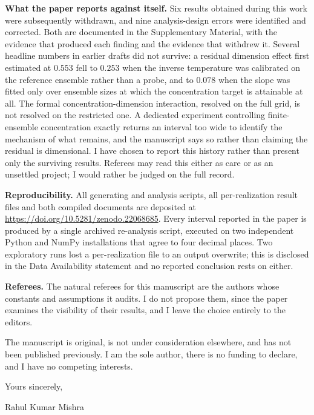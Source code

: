 \documentclass[10.5pt,a4paper]{article}
\begin{document}
\textbf{What the paper reports against itself.} Six results obtained during this work were subsequently withdrawn, and nine analysis-design errors were identified and corrected. Both are documented in the Supplementary Material, with the evidence that produced each finding and the evidence that withdrew it. Several headline numbers in earlier drafts did not survive: a residual dimension effect first estimated at $0.553$ fell to $0.253$ when the inverse temperature was calibrated on the reference ensemble rather than a probe, and to $0.078$ when the slope was fitted only over ensemble sizes at which the concentration target is attainable at all. The formal concentration-dimension interaction, resolved on the full grid, is not resolved on the restricted one. A dedicated experiment controlling finite-ensemble concentration exactly returns an interval too wide to identify the mechanism of what remains, and the manuscript says so rather than claiming the residual is dimensional. I have chosen to report this history rather than present only the surviving results. Referees may read this either as care or as an unsettled project; I would rather be judged on the full record.

\textbf{Reproducibility.} All generating and analysis scripts, all per-realization result files and both compiled documents are deposited at \url{https://doi.org/10.5281/zenodo.22068685}. Every interval reported in the paper is produced by a single archived re-analysis script, executed on two independent Python and NumPy installations that agree to four decimal places. Two exploratory runs lost a per-realization file to an output overwrite; this is disclosed in the Data Availability statement and no reported conclusion rests on either.

\textbf{Referees.} The natural referees for this manuscript are the authors whose constants and assumptions it audits. I do not propose them, since the paper examines the visibility of their results, and I leave the choice entirely to the editors.

The manuscript is original, is not under consideration elsewhere, and has not been published previously. I am the sole author, there is no funding to declare, and I have no competing interests.

\vspace{0.8em}
\noindent
Yours sincerely,

\vspace{1.3em}
\noindent
Rahul Kumar Mishra
\end{document}
